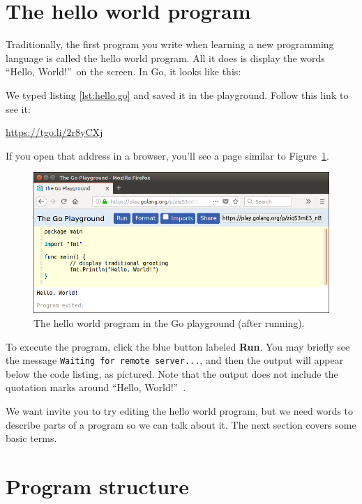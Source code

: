 \section{The hello world program}
\label{hello}

Traditionally, the first program you write when learning a new programming
language is called the hello world program. All it does is display the
words ``Hello, World!''\ on the screen.
In Go, it looks like this:



We typed listing \ref{lst:hello.go} and saved it in the playground.
Follow this link to see it:

\url{https://tgo.li/2r8yCXj}

If you open that address in a browser, you'll see a page similar to Figure~\ref{fig:playhello}.

\begin{figure}[!ht]
\begin{center}
\includegraphics[width=1.0\textwidth]{figs/play-hello.png}
\caption{The hello world program in the Go playground (after running).}
\label{fig:playhello}
\end{center}
\end{figure}

To execute the program, click the blue button labeled {\bf Run}. You may
briefly see the message {\tt Waiting for remote server...}, and then the
output will appear below the code listing, as pictured. Note that the output
does not include the quotation marks around ``Hello, World!''\ .

We want invite you to try editing the hello world program, but we need words
to describe parts of a program so we can talk about it. The next section
covers some basic terms.


\section{Program structure}
\label{program structure}


